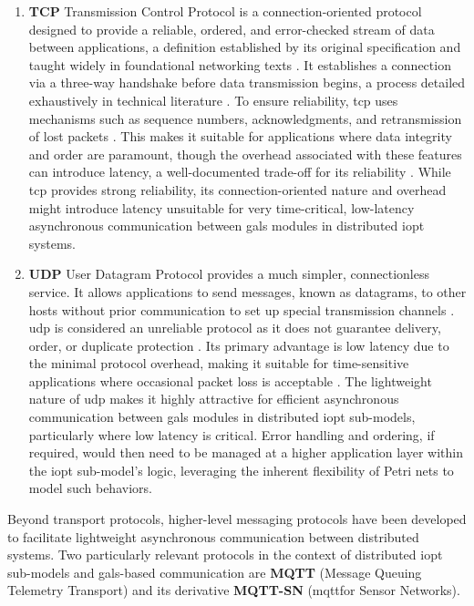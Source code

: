 \begin{enumerate}
    \item \textbf{TCP} Transmission Control Protocol is a connection-oriented protocol designed to provide a reliable, ordered, and error-checked stream of data between applications, a definition established by its original specification \cite{rfc793} and taught widely in foundational networking texts \cite{kurose2021}. It establishes a connection via a three-way handshake before data transmission begins, a process detailed exhaustively in technical literature \cite{stevens1994}. To ensure reliability, \gls{tcp} uses mechanisms such as sequence numbers, acknowledgments, and retransmission of lost packets \cite{rfc793}. This makes it suitable for applications where data integrity and order are paramount, though the overhead associated with these features can introduce latency, a well-documented trade-off for its reliability \cite{kurose2021, stevens1994}. While \gls{tcp} provides strong reliability, its connection-oriented nature and overhead might introduce latency unsuitable for very time-critical, low-latency asynchronous communication between \gls{gals} modules in distributed \gls{iopt} systems.
    \item \textbf{UDP} User Datagram Protocol provides a much simpler, connectionless service. It allows applications to send messages, known as datagrams, to other hosts without prior communication to set up special transmission channels \cite{rfc768}. \gls{udp} is considered an unreliable protocol as it does not guarantee delivery, order, or duplicate protection \cite{kurose2021}. Its primary advantage is low latency due to the minimal protocol overhead, making it suitable for time-sensitive applications where occasional packet loss is acceptable \cite{forouzan2010}. The lightweight nature of \gls{udp} makes it highly attractive for efficient asynchronous communication between \gls{gals} modules in distributed \gls{iopt} sub-models, particularly where low latency is critical. Error handling and ordering, if required, would then need to be managed at a higher application layer within the \gls{iopt} sub-model's logic, leveraging the inherent flexibility of Petri nets to model such behaviors. 

\end{enumerate}


Beyond transport protocols, higher-level messaging protocols have been developed to facilitate lightweight asynchronous communication between distributed systems. Two particularly relevant protocols in the context of distributed \gls{iopt} sub-models and \gls{gals}-based communication are \textbf{MQTT} (Message Queuing Telemetry Transport) and its derivative \textbf{MQTT-SN} (\gls{mqtt}for Sensor Networks).
 
